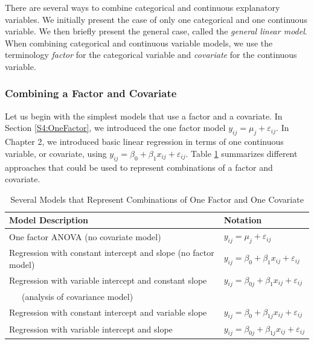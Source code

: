 
There are several ways to combine categorical and continuous
explanatory variables. We initially present the case of only one
categorical and one continuous variable. We then briefly present the
general case, called the \textit{general linear model}. When
combining categorical and continuous variable models, we use the
terminology \emph{factor} for the categorical variable and
\emph{covariate} for the continuous variable.

\subsubsection*{Combining a Factor and Covariate}

Let us begin with the simplest models that use a factor and a
covariate. In Section \ref{S4:OneFactor}, we introduced the one
factor model $ y_{ij}=\mu_j + \varepsilon_{ij}.$ In Chapter 2, we
introduced basic linear regression in terms of one continuous
variable, or covariate, using $ y_{ij}=\beta_0+\beta_1x_{ij} +
\varepsilon_{ij}.$ Table \ref{T4:OneFactorCovariate} summarizes
different approaches that could be used to represent combinations of
a factor and covariate.

 \begin{center}  \begin{table}[h]
\caption{\label{T4:OneFactorCovariate}  Several Models that
Represent Combinations of One Factor and One Covariate}
\begin{tabular}{ll}
\hline Model Description & Notation \\ \hline One factor ANOVA (no
covariate model) &
$y_{ij}=\mu_j+\varepsilon_{ij}$ \\
Regression with constant intercept and slope (no factor
model) & $y_{ij}=\beta_0+\beta_1x_{ij}+\varepsilon_{ij}$ \\
Regression with variable intercept and constant slope &
$y_{ij}=\beta_{0j}+\beta_1x_{ij}+\varepsilon_{ij}$ \\
~~~(analysis of covariance model) &  \\
Regression with constant intercept and variable slope &
$y_{ij}=\beta_0+\beta_{1j}x_{ij}+\varepsilon_{ij}$ \\
Regression with variable intercept and slope &
$y_{ij}=\beta_{0j}+\beta_{1j}x_{ij}+\varepsilon_{ij}$ \\
\hline
\end{tabular}
\end{table}  \end{center}  

